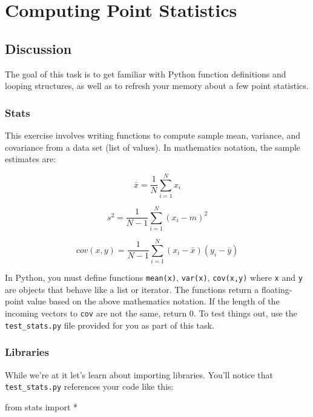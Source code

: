 \chapter{Computing Point Statistics}

\setcounter{problem}{1}
\section{Discussion}

\begin{fullwidth}

The goal of this task is to get familiar with Python function definitions and looping structures, as well as to refresh your memory about a few point statistics. 

\subsection{Stats}

This exercise involves writing functions to compute sample mean, variance, and covariance from a data set (list of values).  In mathematics notation, the sample estimates are:

\[\tag{Sample mean}
\bar x = \frac{1}{N} \sum_{i=1}^{N} x_i 
\]

\[\tag{Unbiased sample variance}
s^2 = \frac{1}{N-1} \sum_{i=1}^{N} (x_i - m)^2
\]

\[\tag{Unbiased sample covariance}
cov(x,y) = \frac{1}{N-1} \sum_{i=1}^{N} (x_i - \bar x)(y_i - \bar y)
\]

In Python, you must define functions {\tt mean(x)}, {\tt var(x)}, {\tt cov(x,y)} where {\tt x} and {\tt y} are objects that behave like a list or iterator. The functions return a floating-point value based on the above mathematics notation. If the length of the incoming vectors to {\tt cov} are not the same, return 0. To test things out, use the {\tt test\_stats.py} file provided for you as part of this task.

\subsection{Libraries}

While we're at it let's learn about importing libraries.  You'll notice that {\tt test\_stats.py} references your code like this:

\begin{pyverbatim}
from stats import *
\end{pyverbatim}


\end{fullwidth}
